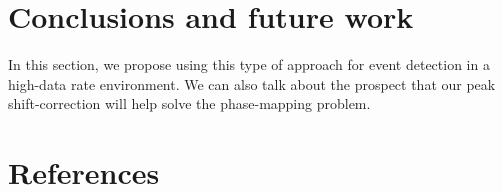 \documentclass[12pt]{iopart}
\begin{document}

\section{Conclusions and future work}

In this section, we propose using this type of approach for event detection in a high-data rate environment. We can also talk about the prospect that our peak shift-correction will help solve the phase-mapping problem.


\section{References}
\end{document}
